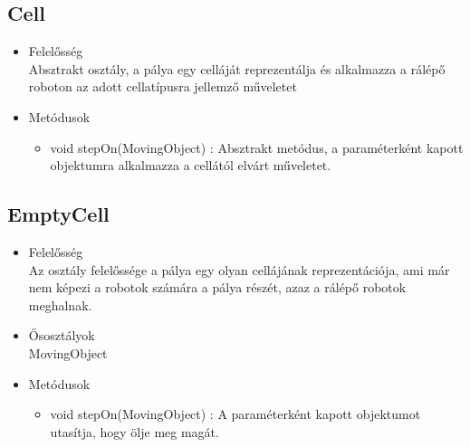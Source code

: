 \subsection{Cell}
\begin{itemize}
	\item Felelősség\\
	Absztrakt osztály, a pálya egy celláját reprezentálja és alkalmazza a rálépő roboton az adott cellatípusra jellemző műveletet
	\item Metódusok
	\begin{itemize}
		\item void stepOn(MovingObject) : Absztrakt metódus, a paraméterként kapott objektumra alkalmazza a cellától elvárt műveletet.
	\end{itemize}
\end{itemize}

\subsection{EmptyCell}
\begin{itemize}
	\item Felelősség\\
	Az osztály felelőssége a pálya egy olyan cellájának reprezentációja, ami már nem képezi a robotok számára a pálya részét, azaz a rálépő robotok meghalnak.
	\item Ősosztályok\\
	MovingObject
	\item Metódusok
	\begin{itemize}
		\item void stepOn(MovingObject) : A paraméterként kapott objektumot utasítja, hogy ölje meg magát.
	\end{itemize}
\end{itemize}

